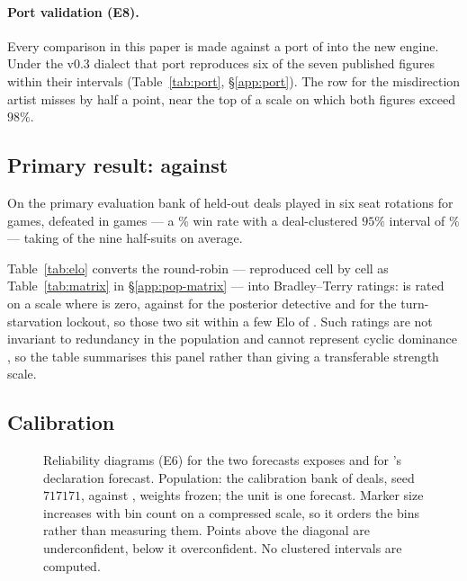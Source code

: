 \paragraph{Port validation (E8).}
Every comparison in this paper is made against a port of \vthree{} into the new
engine. Under the v0.3 dialect that port reproduces six of the seven published
figures within their intervals (Table~\ref{tab:port}, \S\ref{app:port}). The row for the
misdirection artist misses by half a point, near the top of a scale on which both
figures exceed $98\%$.


\subsection{Primary result: \vfast{} against \vthree{}}
\label{sec:results-h2h}

On the primary evaluation bank of \numHtHDeals{} held-out deals played in six
seat rotations for \numHtHGames{} games, \vfast{} defeated \vthree{} in
\numVsVthreeWins{} games --- a \numVsVthree\% win rate with a deal-clustered
$95\%$ interval of \numVsVthreeCI\% --- taking \numVsVthreeSets{} of the nine
half-suits on average.


Table~\ref{tab:elo} converts the round-robin --- reproduced cell by cell as
Table~\ref{tab:matrix} in \S\ref{app:pop-matrix} --- into
Bradley--Terry ratings: \vfast{} is rated \numElo{} on a scale where \vthree{} is
zero, against \numEloDetective{} for the posterior detective and \numEloLockout{}
for the turn-starvation lockout, so those two sit within a few Elo of \vthree{}.
Such ratings are not invariant to redundancy in the population and cannot
represent cyclic dominance \cite{balduzzi-reeval}, so the table summarises this
panel rather than giving a transferable strength scale.

\subsection{Calibration}
\label{sec:results-calib}

\begin{figure}[!htbp]
\centering
\resizebox{\linewidth}{!}{}
\caption{Reliability diagrams (E6) for the two forecasts \vfast{} exposes and for
\vthree{}'s declaration forecast. Population: the calibration bank of
\numCalibDeals{} deals, seed $717171$, \vfast{} against \vthree{}, weights
frozen; the unit is one forecast. Marker size increases with bin count on a
compressed scale, so it orders the bins rather than measuring them.
Points above the diagonal are underconfident, below it overconfident. No
clustered intervals are computed.}
\label{fig:reliability}
\end{figure}

